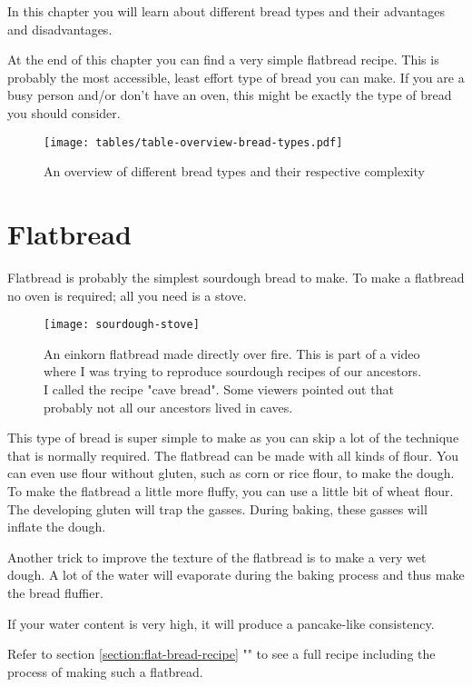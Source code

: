 In this chapter you will learn about different bread types
and their advantages and disadvantages.

At the end of this chapter
you can find a very simple flatbread recipe. This is probably
the most accessible, least effort type of bread you can make.
If you are a busy person and/or don't have an oven, this might
be exactly the type of bread you should consider.

\begin{figure}[!htb]
  \texttt{[image: tables/table-overview-bread-types.pdf]}
  \caption{An overview of different bread types and their respective complexity}
  \label{tab:bread-types-comparison}
\end{figure}

\section{Flatbread}

Flatbread is probably the simplest sourdough bread to make.
To make a flatbread no oven is required; all you need is a stove.

\begin{figure}[!htb]
  \texttt{[image: sourdough-stove]}
  \caption{An einkorn flatbread made directly over fire. This
  is part of a video where I was trying to reproduce sourdough
  recipes of our ancestors. I called the recipe "cave bread". Some viewers
  pointed out that probably not all our ancestors lived in caves.
  }
\end{figure}

This type of bread is super simple to make as you can skip
a lot of the technique that is normally required. The flatbread
can be made with all kinds of flour. You can even use
flour without gluten, such as corn or rice flour, to make the
dough. To make the flatbread a little more fluffy, you
can use a little bit of wheat flour. The developing gluten
will trap the gasses. During baking, these gasses will
inflate the dough.

Another trick to improve the texture of the flatbread is to
make a very wet dough. A lot of the water will evaporate
during the baking process and thus make the bread fluffier.

If your water content is very high, it will produce a
pancake-like consistency.

Refer to section \ref{section:flat-bread-recipe} ""
to see a full recipe including the process of making such a flatbread.


